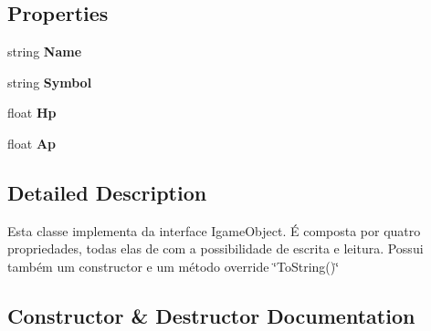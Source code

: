 \subsection*{Properties}
\begin{DoxyCompactItemize}
\item 
\mbox{\label{class_projeto2___l_p1_1_1_player_afceb0be75425c38525a1315024c5b936}} 
string {\bfseries Name}
\item 
\mbox{\label{class_projeto2___l_p1_1_1_player_a56ca0a710ecd1001882e60a94dc9cbe2}} 
string {\bfseries Symbol}
\item 
\mbox{\label{class_projeto2___l_p1_1_1_player_a3c5d5408949bfb0c577e9b13f3509e3e}} 
float {\bfseries Hp}
\item 
\mbox{\label{class_projeto2___l_p1_1_1_player_afe749bfe06459d491a795631847f7eb5}} 
float {\bfseries Ap}
\end{DoxyCompactItemize}


\subsection{Detailed Description}
Esta classe implementa da interface Igame\+Object. É composta por quatro propriedades, todas elas de com a possibilidade de escrita e leitura. Possui também um constructor e um método override \char`\"{}\+To\+String()\char`\"{} 



\subsection{Constructor \& Destructor Documentation}
\mbox{\label{class_projeto2___l_p1_1_1_player_a36e68b67c7dae2744bf816c124c78e4e}} 
